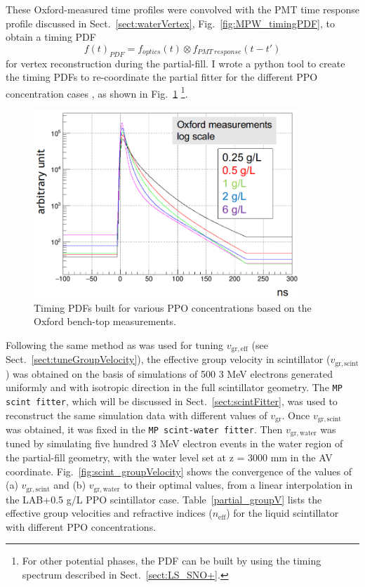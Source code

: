 These Oxford-measured time profiles were convolved with the PMT time response profile discussed in Sect.~\ref{sect:waterVertex}, Fig.~\ref{fig:MPW_timingPDF}, to obtain a timing PDF 
\begin{equation}\label{eq:OxfordTimingPDF}
f(t)_{PDF} = f_{optics}(t)\otimes f_{PMT~response}(t-t')
\end{equation}
for vertex reconstruction during the partial-fill. I wrote a python tool to create the timing PDFs to re-coordinate the partial fitter for the different PPO concentration cases \cite{partialFitterPDF}, as shown in Fig.~\ref{fig:oxfordPdf} \footnote{For other potential phases, the PDF can be built by using the timing spectrum described in Sect.~\ref{sect:LS_SNO+}.}.
\begin{figure}[!htb]
	\centering
	\includegraphics[width=10cm]{oxfordPdf_log.png}
	\caption{Timing PDFs built for various PPO concentrations based on the Oxford bench-top measurements.}
	\label{fig:oxfordPdf}
\end{figure}

Following the same method as was used for tuning $v_\mathrm{gr,eff}$ (see Sect.~\ref{sect:tuneGroupVelocity}), the effective group velocity in scintillator ($v_\mathrm{gr,scint}$) was obtained on the basis of simulations of 500 3 MeV electrons generated uniformly and with isotropic direction in the full scintillator geometry. The \texttt{MP scint fitter}, which will be discussed in Sect.~\ref{sect:scintFitter}, was used to reconstruct the same simulation data with different values of $v_\mathrm{gr}$. Once $v_\mathrm{gr,scint}$ was obtained, it was fixed in the \texttt{MP scint-water fitter}. Then $v_\mathrm{gr,water}$ was tuned by simulating five hundred 3 MeV electron events in the water region of the partial-fill geometry, with the water level set at z = 3000 mm in the AV coordinate. Fig.~\ref{fig:scint_groupVelocity} shows the convergence of the values of (a) $v_\mathrm{gr,scint}$ and (b) $v_\mathrm{gr,water}$ to their optimal values, from a linear interpolation in the LAB+0.5 g/L PPO scintillator case. Table~\ref{partial_groupV} lists the effective group velocities and refractive indices ($n_\mathrm{eff}$) for the liquid scintillator with different PPO concentrations. 
		
